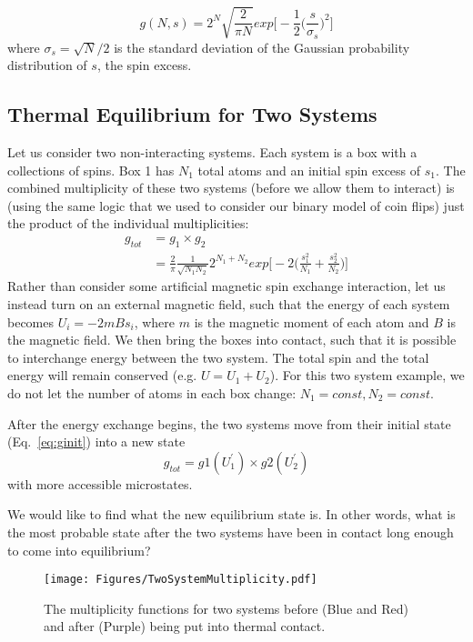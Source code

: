 \begin{equation}
g(N,s) = 2^N \sqrt{\frac{2}{\pi N}} exp\bigg[-\frac{1}{2}\bigg(\frac{s}{\sigma_s}\bigg)^2\bigg]
\end{equation}
where $\sigma_s = \sqrt{N}/2$ is the standard deviation of the Gaussian probability 
distribution of $s$, the spin excess.

\subsection{Thermal Equilibrium for Two Systems}
Let us consider two non-interacting systems. Each system is a box with a collections of
spins. Box 1 has $N_1$ total atoms and an initial spin excess of $s_1$.
The combined multiplicity of these 
two systems (before we allow them to interact) is (using the same logic that we used to consider
our binary model of coin flips) just the product of the individual multiplicities:
\begin{align}
g_{tot} &= g_1 \times g_2 \\
        &= \frac{2}{\pi} \frac{1}{\sqrt{N_1 N_2}} 2^{N_1 + N_2} exp\bigg[-2\bigg(\frac{s_1^2}{N_1} + 
        \frac{s_2^2}{N_2}\bigg)\bigg]
\label{eq:ginit}
\end{align}
Rather than consider some artificial magnetic spin exchange interaction, let us instead
turn on an external magnetic field, such that the energy of each system becomes
$U_i = -2 m B s_i$, where $m$ is the magnetic moment of each atom and $B$ is the magnetic
field. We then bring the boxes into contact, such that it is possible to interchange energy
between the two system. The total spin and the total energy will remain conserved
(e.g. $U = U_1 + U_2$). For this two system example, we do not let the number of atoms in
each box change: $N_1 = const, N_2 = const$.

After the energy exchange begins, the two systems move from their 
initial state (Eq.~\ref{eq:ginit}) into a new state
\begin{equation}
g_{tot} = g1(U_1^\prime) \times g2(U_2^\prime)
\end{equation}
with more accessible microstates.

We would like to find what the new equilibrium state is. In other words, what is the most probable
state after the two systems have been in contact long enough to come into equilibrium?
\begin{figure}[h]
\centering
\texttt{[image: Figures/TwoSystemMultiplicity.pdf]}
\caption{The multiplicity functions for two systems before (Blue and Red) and after (Purple) being put 
	into thermal contact.}
\end{figure}


